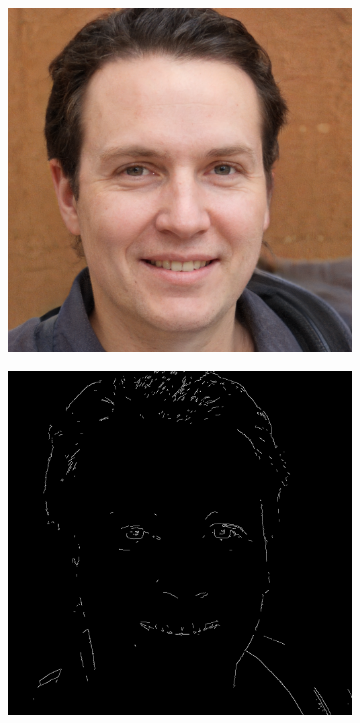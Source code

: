 \documentclass{70_styles/svproc}
\begin{document}
\begin{figure}
\begin{subfigure}[b]{0.2\textwidth}
     \end{subfigure}
    \par\medskip
    \begin{subfigure}[b]{0.2\textwidth}
         \centering
         \includegraphics[width=\textwidth]{70_figures/seed0039.png}
     \end{subfigure}
     \begin{subfigure}[b]{0.2\textwidth}
         \centering
         \includegraphics[width=\textwidth]{70_figures/canny-seed0039.png}

\end{subfigure}
\end{figure}
\end{document}
